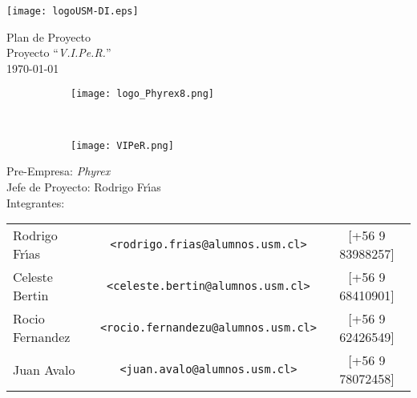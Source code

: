\begin{titlepage} %
\thispagestyle{empty} %
\begin{center}
\texttt{[image: logoUSM-DI.eps]}
\end{center}

\vspace{3cm} %
\begin{center} %
  {
    \Huge Plan de Proyecto\\
    \huge Proyecto ``\emph{V.I.Pe.R.}''\\
    \normalsize\today
  }
\end{center}

\vspace{1cm}

\begin{figure}[H]
  \centering
  \begin{subfigure}[b]{0.4\textwidth}
    \centering
    \texttt{[image: logo\_Phyrex8.png]}
    \label{fig:Phyrex}
  \end{subfigure}
  ~
  \begin{subfigure}[b]{0.25\textwidth}
    \centering
    \texttt{[image: VIPeR.png]}
    \label{fig:Viper}
  \end{subfigure}
\end{figure}

\vfill
\begin{flushleft} %
Pre-Empresa: \emph{Phyrex}\\
Jefe de Proyecto: Rodrigo Fr\'{\i}as\\
Integrantes:
\begin{table}[hb]
  \begin{tabular}{lcc}
    Rodrigo Fr\'{\i}as & \texttt{\small <rodrigo.frias@alumnos.usm.cl>} & [+56 9 83988257] \\
    Celeste Bertin & \texttt{\small <celeste.bertin@alumnos.usm.cl>} &[+56 9 68410901]\\
    Rocio Fernandez &\texttt{\small <rocio.fernandezu@alumnos.usm.cl>} & [+56 9 62426549]\\
    Juan Avalo & \texttt{\small <juan.avalo@alumnos.usm.cl>} & [+56 9 78072458]\\
  \end{tabular}
\end{table}
\end{flushleft}
\end{titlepage}
